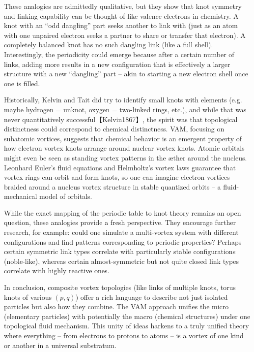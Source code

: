These analogies are admittedly qualitative, but they show that knot symmetry and linking capability can be thought of like valence electrons in chemistry. A knot with an “odd dangling” part seeks another to link with (just as an atom with one unpaired electron seeks a partner to share or transfer that electron). A completely balanced knot has no such dangling link (like a full shell). Interestingly, the periodicity could emerge because after a certain number of links, adding more results in a new configuration that is effectively a larger structure with a new “dangling” part – akin to starting a new electron shell once one is filled.


Historically, Kelvin and Tait did try to identify small knots with elements (e.g. maybe hydrogen = unknot, oxygen = two-linked rings, etc.), and while that was never quantitatively successful【Kelvin1867】, the spirit was that topological distinctness could correspond to chemical distinctness. VAM, focusing on subatomic vortices, suggests that chemical behavior is an emergent property of how electron vortex knots arrange around nuclear vortex knots. Atomic orbitals might even be seen as standing vortex patterns in the æther around the nucleus. Leonhard Euler’s fluid equations and Helmholtz’s vortex laws guarantee that vortex rings can orbit and form knots, so one can imagine electron vortices braided around a nucleus vortex structure in stable quantized orbits – a fluid-mechanical model of orbitals.


While the exact mapping of the periodic table to knot theory remains an open question, these analogies provide a fresh perspective. They encourage further research, for example: could one simulate a multi-vortex system with different configurations and find patterns corresponding to periodic properties? Perhaps certain symmetric link types correlate with particularly stable configurations (noble-like), whereas certain almost-symmetric but not quite closed link types correlate with highly reactive ones.


In conclusion, composite vortex topologies (like links of multiple knots, torus knots of various $(p,q)$) offer a rich language to describe not just isolated particles but also how they combine. The VAM approach unifies the micro (elementary particles) with potentially the macro (chemical structures) under one topological fluid mechanism. This unity of ideas harkens to a truly unified theory where everything – from electrons to protons to atoms – is a vortex of one kind or another in a universal substratum.


